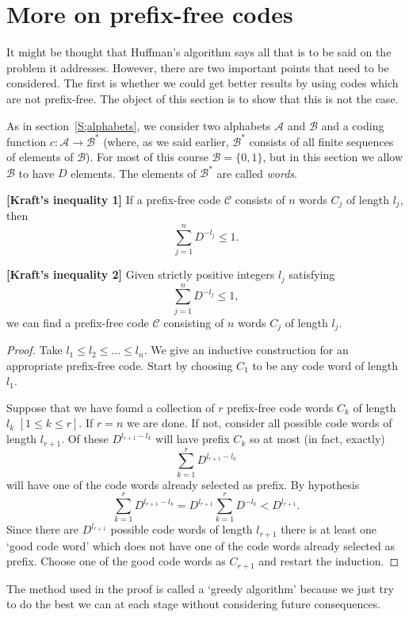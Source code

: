 \section{More on prefix-free codes}\label{S;prefix} 
It might be thought that
Huffman's algorithm says all that is to be said on
the problem it addresses. However, there are two important
points that need to be considered. The first is whether
we could get better results by using codes which
are not prefix-free. The object of this section is
to show that this is not the case.

As in section~\ref{S;alphabets},
we consider two alphabets ${\mathcal A}$
and ${\mathcal B}$ 
and a coding function $c:{\mathcal A}\rightarrow{\mathcal B}^{*}$
(where, as we said earlier, 
${\mathcal B}^{*}$ consists of all finite sequences of 
elements of  ${\mathcal B}$).  For most of this
course ${\mathcal B}=\{0,1\}$, but in this section
we allow ${\mathcal B}$ to have $D$ elements.
The elements of ${\mathcal B}^{*}$ are called \emph{words}.

\begin{lemma} {\bf [Kraft's inequality 1]}\label{Kraft 1}
If a prefix-free code ${\mathcal C}$ consists
of $n$ words $C_{j}$ of length $l_{j}$, then
\[\sum_{j=1}^{n}D^{-l_{j}}\leq 1.\]
\end{lemma}
\begin{lemma} {\bf [Kraft's inequality 2]}\label{L;Kraft 2}
Given strictly positive integers $l_{j}$ satisfying
\[\sum_{j=1}^{n}D^{-l_{j}}\leq 1,\]
we can find a prefix-free code ${\mathcal C}$ consisting
of $n$ words $C_{j}$ of length $l_{j}$.
\end{lemma}
\begin{proof} Take $l_{1}\leq l_{2}\leq\dots\leq l_{n}$.
We give an inductive construction for an appropriate
prefix-free code. Start by choosing $C_{1}$ to be
any  code word  of length $l_{1}$.

Suppose that we have found a collection of $r$ prefix-free
code words $C_{k}$ of length $l_{k}$ $[1\leq k\leq r]$.
If $r=n$ we are done. If not, consider all 
possible code words
of length $l_{r+1}$. Of these $D^{l_{r+1}-l_{k}}$ will
have prefix $C_{k}$ so at most (in fact, exactly)
\[\sum_{k=1}^{r}D^{l_{r+1}-l_{k}}\]
will have one of the code words already selected as prefix.
By hypothesis
\[\sum_{k=1}^{r}D^{l_{r+1}-l_{k}}
=D^{l_{r+1}}\sum_{k=1}^{r}D^{-l_{k}}<D^{l_{r+1}}.\]
Since there are $D^{l_{r+1}}$ possible code words of length 
$l_{r+1}$ there is at least one `good code word'
which does not
have one of the code words already selected as prefix.
Choose one of the good code words as $C_{r+1}$
and restart the induction.
\end{proof}
The method used in the proof is called a `greedy algorithm'
because we just try to do the best we can at each stage
without considering future consequences.


